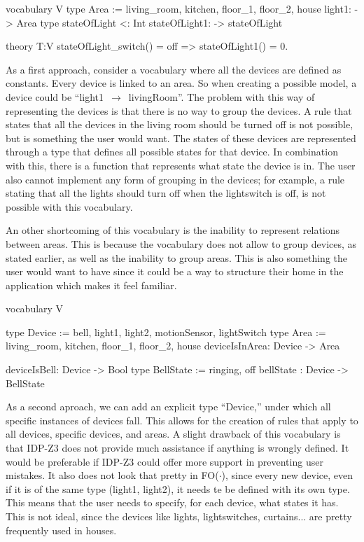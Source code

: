 \documentclass[11pt,a4paper]{report}
\newcommand{\fodot}{FO($\cdot$)\xspace}
\begin{document}
\begin{idplisting}
vocabulary V {
    type Area := {living_room, kitchen, floor_1, floor_2, house}
    light1: -> Area
    type stateOfLight <: Int
    stateOfLight1: -> stateOfLight
}

theory T:V {
    stateOfLight_switch() = off => stateOfLight1() = 0.
}
\end{idplisting}

As a first approach, consider a vocabulary where all the devices are defined as constants. Every device is linked to an area. So when creating a possible model, a device could be ``light1~$\rightarrow$~livingRoom''. The problem with this way of representing the devices is that there is no way to group the devices. A rule that states that all the devices in the living room should be turned off is not possible, but is something the user would want. The states of these devices are represented through a type that defines all possible states for that device. In combination with this, there is a function that represents what state the device is in. The user also cannot implement any form of grouping in the devices; for example, a rule stating that all the lights should turn off when the lightswitch is off, is not possible with this vocabulary.

An other shortcoming of this vocabulary is the inability to represent relations between areas. This is because the vocabulary does not allow to group devices, as stated earlier, as well as the inability to group areas. This is also something the user would want to have since it could be a way to structure their home in the application which makes it feel familiar.

\begin{idplisting}
vocabulary V {
    type Device := {bell, light1, light2, motionSensor, lightSwitch}
    type Area := {living_room, kitchen, floor_1, floor_2, house}
    deviceIsInArea: Device -> Area

    deviceIsBell: Device -> Bool
    type BellState := {ringing, off}
    bellState : Device -> BellState
}
\end{idplisting}

As a second aproach, we can add an explicit type ``Device,'' under which all specific instances of devices fall. This allows for the creation of rules that apply to all devices, specific devices, and areas. A slight drawback of this vocabulary is that IDP-Z3 does not provide much assistance if anything is wrongly defined. It would be preferable if IDP-Z3 could offer more support in preventing user mistakes. It also does not look that pretty in \fodot, since every new device, even if it is of the same type (light1, light2), it needs te be defined with its own type. This means that the user needs to specify, for each device, what states it has. This is not ideal, since the devices like lights, lightswitches, curtains... are pretty frequently used in houses.
\end{document}
